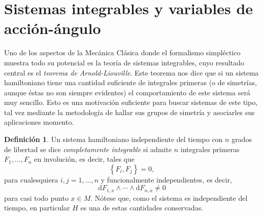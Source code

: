 \documentclass[11pt,a4paper,twoside]{article}
\theoremstyle{definition} \newtheorem{defn}[thm]{Definición}
\theoremstyle{definition} \newtheorem{ejemplo}[thm]{Ejemplo}
\theoremstyle{definition} \newtheorem{ejercicio}[thm]{Ejercicio}
\theoremstyle{remark} \newtheorem*{obs}{Observación}
\def\dd{\mathrm{d}}
\begin{document}
  \section{Sistemas integrables y variables de acción-ángulo}\label{integrables}

  Uno de los aspectos de la Mecánica Clásica donde el formalismo simpléctico muestra todo su potencial es la teoría de sistemas integrables, cuyo resultado central es el \emph{teorema de Arnold-Liouville}.
  Este teorema nos dice que si un sistema hamiltoniano tiene una cantidad suficiente de integrales primeras (o de simetrías, aunque éstas no son siempre evidentes) el comportamiento de este sistema será muy sencillo. Esto es una motivación suficiente para buscar sistemas de este tipo, tal vez mediante la metodología de hallar sus grupos de simetría y asociarles sus aplicaciones momento.

  \begin{defn}
    Un sistema hamiltoniano independiente del tiempo con $n$ grados de libertad se dice \emph{completamente integrable} si admite $n$ integrales primeras $F_1,\dots,F_n$ en involución, es decir, tales que
    \begin{equation}
      \left\{ F_i,F_j \right\}=0,  
    \end{equation}
    para cualesquiera $i,j=1,\dots,n$ y funcionalmente independientes, es decir,
    \begin{equation}
      \dd F_{1,x} \wedge \cdots \wedge \dd F_{n,x}\neq 0
    \end{equation}
    para casi todo punto $x\in M$. Nótese que, como el sistema es independiente del tiempo, en particular $H$ es una de estas cantidades conservadas.
  \end{defn}
\end{document}
